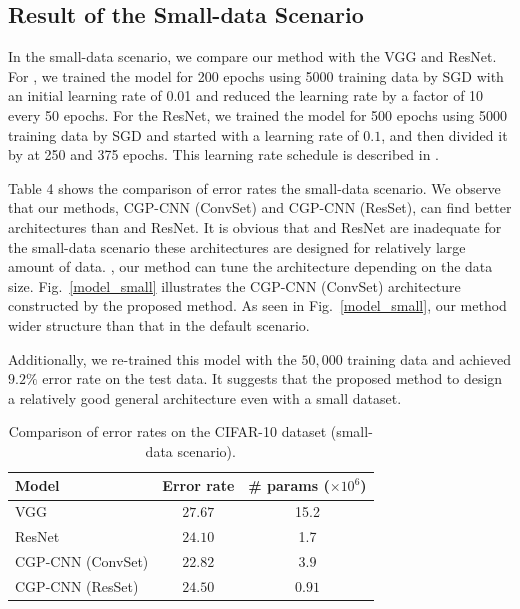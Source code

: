 \subsection{Result of the Small-data Scenario}
In the small-data scenario, we compare our method with the VGG and ResNet.
For , we  trained the model for 200 epochs using 5000 training data by SGD with an initial learning rate of 0.01\new{,} and  reduced the learning rate by a factor of 10 every 50 epochs.
For the ResNet, we  trained the model for 500 epochs using 5000 training data by SGD and started with a learning rate of $0.1$, and then divided it by  at 250 and 375 epochs. This learning rate schedule is described in \cite{he_deep_2016}.

Table 4 shows the comparison of error rates  the small-data scenario. We observe that our methods, CGP-CNN (ConvSet) and CGP-CNN (ResSet), can find better architectures than  and ResNet.
It is obvious that  and ResNet are inadequate for the small-data scenario  these architectures are designed for  relatively large amount of data. , our method can tune the architecture depending on the data size.
Fig.~\ref{model_small} illustrates the CGP-CNN (ConvSet) architecture constructed by  the proposed method.
As seen in Fig.~\ref{model_small}, our method  wider structure than that in the default scenario.

Additionally, we  re-trained this model with the $50,000$ training data and achieved  $9.2\%$ error rate on the test data. It suggests that the proposed method  to design a relatively good general architecture even with a small dataset.


\begin{table}[t]
  \caption{Comparison of error rates on the CIFAR-10 dataset (small-data scenario).}
  \label{results_small}
  \begin{tabular}{l|c|c} \hline
   Model & Error rate & \# params ($\times 10^6$) \\ \hline
   VGG \cite{simonyan_very_2014} & $27.67$ & 15.2 \\
   ResNet \cite{he_deep_2016} & $24.10$ & 1.7 \\ 
   CGP-CNN (ConvSet) & $22.82$  & $3.9$  \\
   CGP-CNN (ResSet) & $24.50$ & $0.91$ \\ \hline
  \end{tabular}
\end{table}

